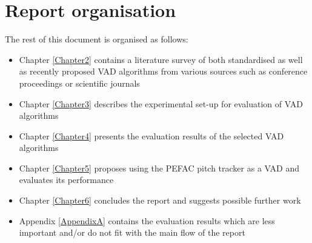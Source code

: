 \section{Report organisation}

The rest of this document is organised as follows:
\begin{itemize}
\item Chapter \ref{Chapter2} contains a literature survey of both standardised as well as recently proposed VAD algorithms from various sources such as conference proceedings or scientific journals
\item Chapter \ref{Chapter3} describes the experimental set-up for evaluation of VAD algorithms
\item Chapter \ref{Chapter4} presents the evaluation results of the selected VAD algorithms
\item Chapter \ref{Chapter5} proposes using the PEFAC pitch tracker \cite{PEFAC} as a VAD and evaluates its performance
\item Chapter \ref{Chapter6} concludes the report and suggests possible further work 
\item Appendix \ref{AppendixA} contains the evaluation results which are less important and/or do not fit with the main flow of the report
\end{itemize}